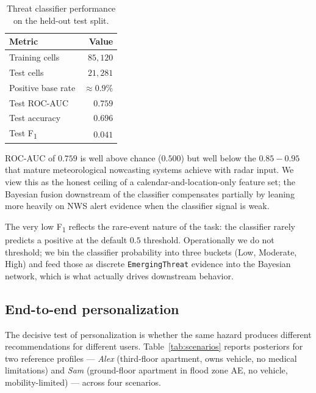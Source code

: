 \documentclass{article}
\theoremstyle{plain}
\theoremstyle{definition}
\theoremstyle{remark}
\begin{document}
\begin{table}[h]
\caption{Threat classifier performance on the held-out test split.}
\label{tab:clf}
\centering\small
\begin{tabular}{lr}
\toprule
\textbf{Metric} & \textbf{Value} \\
\midrule
Training cells       & $85{,}120$ \\
Test cells           & $21{,}281$ \\
Positive base rate   & $\approx 0.9\%$ \\
Test ROC-AUC         & $\mathbf{0.759}$ \\
Test accuracy        & $0.696$ \\
Test F\textsubscript{1} & $0.041$ \\
\bottomrule
\end{tabular}
\end{table}

ROC-AUC of $0.759$ is well above chance ($0.500$) but well below the
$0.85\!-\!0.95$ that mature meteorological nowcasting systems achieve
with radar input. We view this as the honest ceiling of a
calendar-and-location-only feature set; the Bayesian fusion downstream
of the classifier compensates partially by leaning more heavily on
NWS alert evidence when the classifier signal is weak.

The very low F\textsubscript{1} reflects the rare-event nature of the
task: the classifier rarely predicts a positive at the default $0.5$
threshold. Operationally we do not threshold; we bin the classifier
probability into three buckets (Low, Moderate, High) and feed those as
discrete \texttt{EmergingThreat} evidence into the Bayesian network,
which is what actually drives downstream behavior.

\subsection{End-to-end personalization}
\label{sec:personalization}

The decisive test of personalization is whether the same hazard
produces different recommendations for different users.
Table~\ref{tab:scenarios} reports posteriors for two reference
profiles --- \emph{Alex} (third-floor apartment, owns vehicle, no
medical limitations) and \emph{Sam} (ground-floor apartment in flood
zone AE, no vehicle, mobility-limited) --- across four scenarios.
\end{document}
